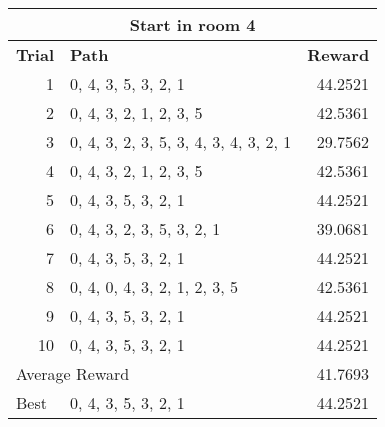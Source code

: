 \documentclass[../Head/Main.tex]{subfiles}
\begin{document}
\begin{tabular}{r l r}
	\hline
	\multicolumn{3}{c}{\textbf{\large Start in room 4}} \\
	\hline 
	\multicolumn{1}{l}{\textbf{Trial}} & \textbf{Path} & \textbf{Reward} \\ 			\hline
	1  & 0, 4, 3, 5, 3, 2, 1                    & 44.2521\\
	2  & 0, 4, 3, 2, 1, 2, 3, 5                 & 42.5361\\
	3  & 0, 4, 3, 2, 3, 5, 3, 4, 3, 4, 3, 2, 1  & 29.7562\\
	4  & 0, 4, 3, 2, 1, 2, 3, 5                 & 42.5361\\
	5  & 0, 4, 3, 5, 3, 2, 1                    & 44.2521\\
	6  & 0, 4, 3, 2, 3, 5, 3, 2, 1              & 39.0681\\
	7  & 0, 4, 3, 5, 3, 2, 1                    & 44.2521\\
	8  & 0, 4, 0, 4, 3, 2, 1, 2, 3, 5           & 42.5361\\
	9  & 0, 4, 3, 5, 3, 2, 1                    & 44.2521\\
	10 & 0, 4, 3, 5, 3, 2, 1                    & 44.2521\\
	\hline
	\multicolumn{2}{l}{Average Reward} & 41.7693 \\
	\hline	
	\multicolumn{1}{l}{Best} & 0, 4, 3, 5, 3, 2, 1  & 44.2521\\
	\hline
\end{tabular}
\end{document}
